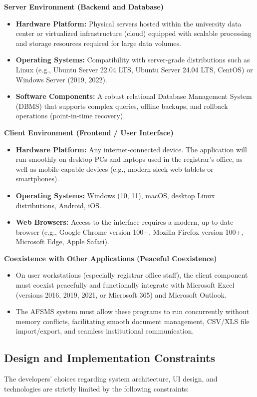 \documentclass[11pt, a4paper]{article}
\begin{document}
\textbf{Server Environment (Backend and Database)}
\begin{itemize}
    \item \textbf{Hardware Platform:} Physical servers hosted within the university data center or virtualized infrastructure (cloud) equipped with scalable processing and storage resources required for large data volumes.
    \item \textbf{Operating Systems:} Compatibility with server-grade distributions such as Linux (e.g., Ubuntu Server 22.04 LTS, Ubuntu Server 24.04 LTS, CentOS) or Windows Server (2019, 2022).
    \item \textbf{Software Components:} A robust relational Database Management System (DBMS) that supports complex queries, offline backups, and rollback operations (point-in-time recovery).
\end{itemize}

\textbf{Client Environment (Frontend / User Interface)}
\begin{itemize}
    \item \textbf{Hardware Platform:} Any internet-connected device. The application will run smoothly on desktop PCs and laptops used in the registrar's office, as well as mobile-capable devices (e.g., modern sleek web tablets or smartphones).
    \item \textbf{Operating Systems:} Windows (10, 11), macOS, desktop Linux distributions, Android, iOS.
    \item \textbf{Web Browsers:} Access to the interface requires a modern, up-to-date browser (e.g., Google Chrome version 100+, Mozilla Firefox version 100+, Microsoft Edge, Apple Safari).
\end{itemize}

\textbf{Coexistence with Other Applications (Peaceful Coexistence)}
\begin{itemize}
    \item On user workstations (especially registrar office staff), the client component must coexist peacefully and functionally integrate with Microsoft Excel (versions 2016, 2019, 2021, or Microsoft 365) and Microsoft Outlook.
    \item The AFSMS system must allow these programs to run concurrently without memory conflicts, facilitating smooth document management, CSV/XLS file import/export, and seamless institutional communication.
\end{itemize}

\subsection{Design and Implementation Constraints}
The developers' choices regarding system architecture, UI design, and technologies are strictly limited by the following constraints:
\end{document}
